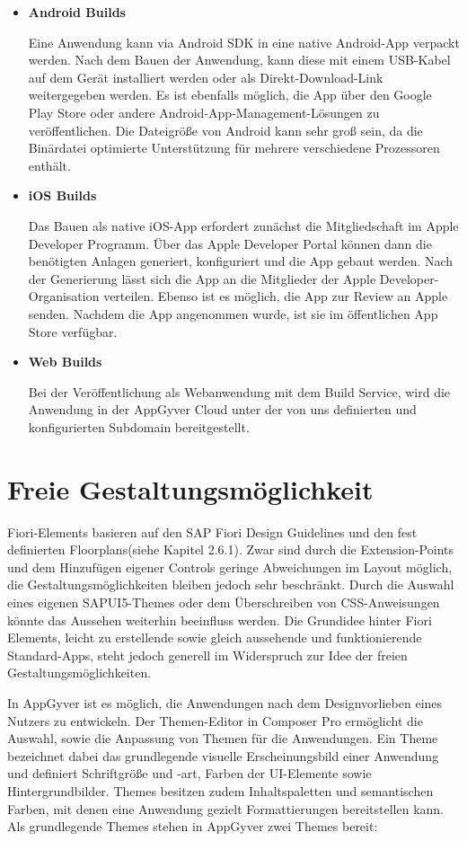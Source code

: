 \begin{itemize}[noitemsep]
\item \textbf{Android Builds} 

Eine Anwendung kann via Android SDK in eine native Android-App verpackt werden. Nach dem Bauen der Anwendung, kann diese mit einem USB-Kabel auf dem Gerät installiert werden oder als Direkt-Download-Link weitergegeben werden.  Es ist ebenfalls möglich, die App über den Google Play Store oder andere Android-App-Management-Lösungen zu veröffentlichen. Die Dateigröße von Android kann sehr groß sein, da die Binärdatei optimierte Unterstützung für mehrere verschiedene Prozessoren enthält\cite{app:bu}. 
\item \textbf{iOS Builds} 

Das Bauen als native iOS-App erfordert zunächst die Mitgliedschaft im Apple Developer Programm. Über das Apple Developer Portal können dann die benötigten Anlagen generiert, konfiguriert und die App gebaut werden. Nach der Generierung lässt sich die App an die Mitglieder der Apple Developer-Organisation verteilen. Ebenso ist es möglich, die App zur Review an Apple senden. Nachdem die App angenommen wurde, ist sie im öffentlichen App Store verfügbar\cite{app:ios}. 
\item \textbf{Web Builds} 

Bei der Veröffentlichung als Webanwendung mit dem Build Service, wird die Anwendung in der AppGyver Cloud unter der von uns definierten und konfigurierten Subdomain bereitgestellt.
\end{itemize}

\section{Freie Gestaltungsmöglichkeit}

Fiori-Elements basieren auf den SAP Fiori Design Guidelines und den fest definierten Floorplans(siehe Kapitel 2.6.1). Zwar sind durch die Extension-Points und dem Hinzufügen eigener Controls geringe Abweichungen im Layout möglich, die Gestaltungsmöglichkeiten bleiben jedoch sehr beschränkt. Durch die Auswahl eines eigenen SAPUI5-Themes oder dem Überschreiben von CSS-Anweisungen könnte das Aussehen weiterhin beeinfluss werden. Die Grundidee hinter Fiori Elements, leicht zu erstellende sowie gleich aussehende und funktionierende Standard-Apps, steht jedoch generell im Widerspruch zur Idee der freien Gestaltungsmöglichkeiten.

In AppGyver ist es möglich, die Anwendungen nach dem Designvorlieben eines Nutzers zu entwickeln. Der Themen-Editor in Composer Pro ermöglicht die Auswahl, sowie die Anpassung von Themen für die Anwendungen. Ein Theme bezeichnet dabei das grundlegende visuelle Erscheinungsbild einer Anwendung und definiert Schriftgröße und -art, Farben der UI-Elemente sowie Hintergrundbilder\cite{hel:the}. Themes besitzen zudem Inhaltspaletten und semantischen Farben, mit denen eine Anwendung gezielt Formattierungen bereitstellen kann\cite{appg:the}. Als grundlegende Themes stehen in AppGyver zwei Themes bereit: 

